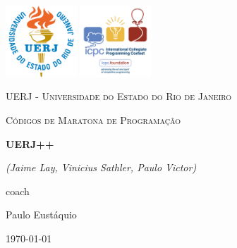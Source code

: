 \documentclass[oneside]{book}
\begin{document}
\begin{titlepage}
	\centering

	\includegraphics[width=0.20\textwidth]{./uerj-logo.png}\vspace{1.3cm}
	\includegraphics[width=0.20\textwidth]{./icpc-logo.png}\par\vspace{1.3cm}
	{\scshape\LARGE UERJ - Universidade do Estado do Rio de Janeiro \par}
	\vspace{1cm}
	{\scshape\Large Códigos de Maratona de Programação\par}
	\vspace{1.5cm}
	{\huge\bfseries UERJ++\par}
	\vspace{2cm}
	{\Large\itshape (Jaime Lay, Vinicius Sathler, Paulo Victor)\par}
	\vfill
	coach\par
	Paulo Eustáquio

	\vfill

	{\large \today\par}
\end{titlepage}
\tableofcontents


\end{document}
